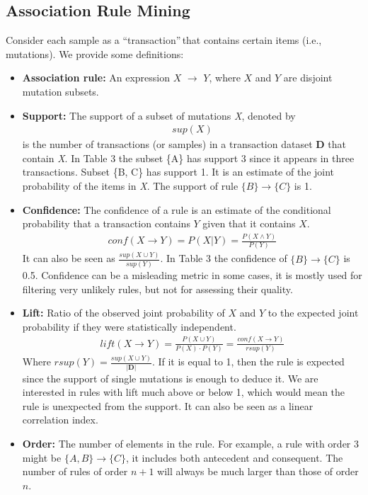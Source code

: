 \documentclass[twoside,twocolumn]{article}
\begin{document}
	\subsection{Association Rule Mining}
	Consider each sample as a \textquotedblleft transaction\textquotedblright$\,$that contains certain items (i.e., mutations). We provide some definitions:
	\begin{itemize}
		\item \textbf{Association rule:} An expression $X$ $\rightarrow$ $Y$, where $X$ and $Y$ are disjoint mutation subsets. 
		\item \textbf{Support:} The support of a subset of mutations \textit{X}, denoted by 
		\begin{align*}
			sup(X)
		\end{align*} is the number of transactions (or samples) in a transaction dataset \textbf{D} that contain \textit{X}. In Table 3 the subset \{A\} has support 3 since it appears in three transactions. Subset \{B, C\} has support 1. It is an estimate of the joint probability of the items in \textit{X}. The support of rule $\{B\} \rightarrow \{C\}$ is 1.
		\item \textbf{Confidence:} The confidence of a rule is an estimate of the conditional probability that a transaction contains $Y$ given that it contains $X$.
		\begin{align*}
			conf(X \rightarrow Y) = P(X|Y) = \frac{P(X \land Y)}{P(Y)}
		\end{align*}
		It can also be seen as $\frac{sup(X \cup Y)}{sup(Y)}$. In Table 3 the confidence of $\{B\} \rightarrow \{C\}$ is 0.5. Confidence can be a misleading metric in some cases, it is mostly used for filtering very unlikely rules, but not for assessing their quality.
		\item \textbf{Lift:} Ratio of the observed joint probability of $X$ and $Y$ to the expected joint probability if they were statistically independent.	
		\begin{align*}
			lift(X \rightarrow Y) = \frac{P(X\cup Y)}{P(X)\cdot P(Y)} = \frac{conf(X\rightarrow Y)}{rsup(Y)}
		\end{align*}
		Where $rsup(Y) = \frac{sup(X\cup Y)}{|\mathbf{D}|}$. If it is equal to 1, then the rule is expected since the support of single mutations is enough to deduce it. We are interested in rules with lift much above or below 1, which would mean the rule is unexpected from the support. It can also be seen as a linear correlation index. 
		\item \textbf{Order: } The number of elements in the rule. For example, a rule with order 3 might be $\{A,B\} \rightarrow \{C\}$, it includes both antecedent and consequent. The number of rules of order $n + 1$ will always be much larger than those of order $n$.
	\end{itemize}
\end{document}
